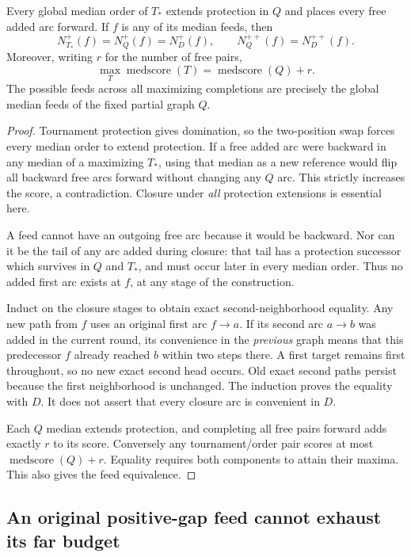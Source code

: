 \begin{lemma}
\label{lem:iterated-closure-original-feed-neighborhoods}
Every global median order of $T_*$ extends protection in $Q$ and places
every free added arc forward. If $f$ is any of its median feeds, then
\[
 N_{T_*}^+(f)=N_Q^+(f)=N_D^+(f),\qquad
 N_Q^{++}(f)=N_D^{++}(f).
\]
Moreover, writing $r$ for the number of free pairs,
\[
 \max_T\operatorname{medscore}(T)
   =\operatorname{medscore}(Q)+r.
\]
The possible feeds across all maximizing completions are precisely the
global median feeds of the fixed partial graph $Q$.
\end{lemma}
\begin{proof}
Tournament protection gives domination, so the two-position swap forces
every median order to extend protection. If a free added arc were
backward in any median of a maximizing $T_*$, using that median as a new
reference would flip all backward free arcs forward without changing any
$Q$ arc. This strictly increases the score, a contradiction. Closure
under \emph{all} protection extensions is essential here.

A feed cannot have an outgoing free arc because it would be backward.
Nor can it be the tail of any arc added during closure: that tail has
a protection successor which survives in $Q$ and $T_*$, and must occur
later in every median order. Thus no added first arc exists at $f$,
at any stage of the construction.

Induct on the closure stages to obtain exact second-neighborhood equality.
Any new path from $f$ uses an original first arc $f\to a$. If its
second arc $a\to b$ was added in the current round, its convenience in
the \emph{previous} graph means that this predecessor $f$ already reached
$b$ within two steps there. A first target remains first throughout, so
no new exact second head occurs. Old exact second paths persist because
the first neighborhood is unchanged. The induction proves the equality
with $D$. It does not assert that every closure arc is convenient in $D$.

Each $Q$ median extends protection, and completing all free pairs forward
adds exactly $r$ to its score. Conversely any tournament/order pair scores
at most $\operatorname{medscore}(Q)+r$. Equality requires both components
to attain their maxima. This also gives the feed equivalence.
\end{proof}

\subsection{An original positive-gap feed cannot exhaust its far budget}

